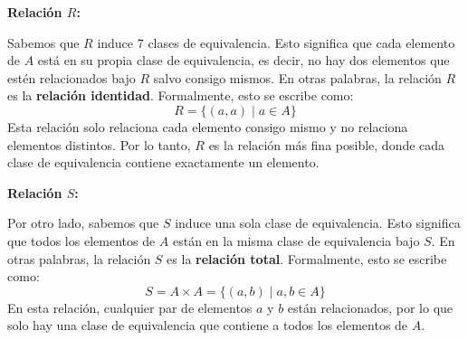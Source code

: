 \begin{solution}

\textbf{Relación \( R \):}

Sabemos que \( R \) induce 7 clases de equivalencia. Esto significa que cada elemento de \( A \) está en su propia clase de equivalencia, es decir, no hay dos elementos que estén relacionados bajo \( R \) salvo consigo mismos. En otras palabras, la relación \( R \) es la \textbf{relación identidad}. Formalmente, esto se escribe como:
\[
R = \{(a, a) \mid a \in A\}
\]
Esta relación solo relaciona cada elemento consigo mismo y no relaciona elementos distintos. Por lo tanto, \( R \) es la relación más fina posible, donde cada clase de equivalencia contiene exactamente un elemento.

\textbf{Relación \( S \):}

Por otro lado, sabemos que \( S \) induce una sola clase de equivalencia. Esto significa que todos los elementos de \( A \) están en la misma clase de equivalencia bajo \( S \). En otras palabras, la relación \( S \) es la \textbf{relación total}. Formalmente, esto se escribe como:
\[
S = A \times A = \{(a, b) \mid a, b \in A\}
\]
En esta relación, cualquier par de elementos \( a \) y \( b \) están relacionados, por lo que solo hay una clase de equivalencia que contiene a todos los elementos de \( A \).

\end{solution}